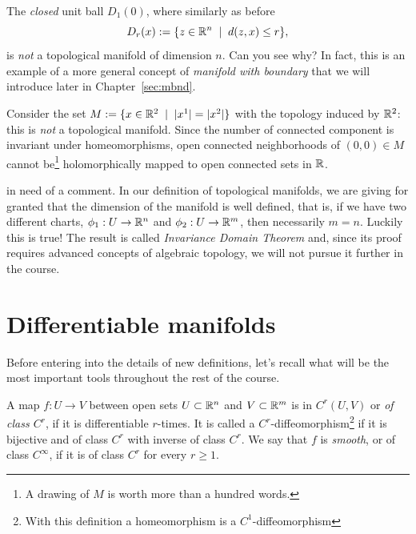 \begin{ex}\label{ex:uball}
  The \emph{closed} unit ball $D_1(0)$, where similarly as before
  \begin{equation}
    D_r(x) := \{z\in\mathbb{R}^n \;\mid\; d(z,x) \leq r\},
  \end{equation}
  is \emph{not} a topological manifold of dimension $n$. Can you see why? In fact, this is an example of a more general concept of \emph{manifold with boundary} that we will introduce later in Chapter~\ref{sec:mbnd}.
\end{ex}

\begin{ex}
	Consider the set $M := \{ x\in\mathbb{R}^2 \;\mid\; |x^1| = |x^2| \}$ with the topology induced by $\mathbb{R}^2$:
   this is \emph{not} a topological manifold.
	Since the number of connected component is invariant under homeomorphisms, open connected neighborhoods of $(0,0)\in M$ cannot be\footnote{A drawing of $M$ is worth more than a hundred words.} holomorphically mapped to open connected sets in $\mathbb{R}$.
\end{ex}

 in need of a comment.
In our definition of topological manifolds, we are giving for granted that the dimension of the manifold is well defined, that is, if we have two different charts, $\phi_1: U \to \mathbb{R}^n$ and $\phi_2: U \to \mathbb{R}^m$, then necessarily $m=n$. Luckily this is true! The result is called \emph{Invariance Domain Theorem} and, since its proof requires advanced concepts of algebraic topology, we will not pursue it further in the course.

\section{Differentiable manifolds}

Before entering into the details of new definitions, let's recall what will be the most important tools throughout the rest of the course.

\begin{defn}
  A map $f: U \to V$ between open sets $U\subset\mathbb{R}^n$ and $V\subset\mathbb{R}^m$ is in $C^r(U,V)$ or \emph{of class $C^r$}, if it is differentiable $r$-times.
  It is called a $C^r$-diffeomorphism\footnote{With this definition a homeomorphism is a $C^1$-diffeomorphism} if it is bijective and of class $C^r$ with inverse of class $C^r$.
  We say that $f$ is \emph{smooth}, or of class $C^\infty$, if it is of class $C^r$ for every $r \geq 1$.
\end{defn}

